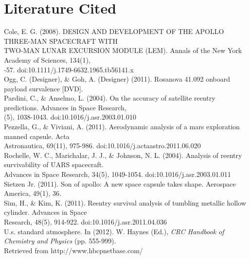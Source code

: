 \documentclass{article}
\begin{document}
\section{Literature Cited}
	\begin{doublespace}
Cole, E. G. (2008). DESIGN AND DEVELOPMENT OF THE APOLLO THREE-MAN SPACECRAFT WITH\\
\indent TWO-MAN LUNAR EXCURSION MODULE (LEM). Annals of the New York Academy of Sciences, 134(1),\\
-57. doi:10.1111/j.1749-6632.1965.tb56141.x\\
Ogg, C. (Designer), \& Goh, A. (Designer) (2011). Rosanova 41.092 onboard payload survalence [DVD].\\
Pardini, C., \& Anselmo, L. (2004). On the accuracy of satellite reentry predictions. Advances in Space Research,\\ (5), 1038-1043. doi:10.1016/j.asr.2003.01.010\\
Pezzella, G., \& Viviani, A. (2011). Aerodynamic analysis of a mars exploration manned capsule. Acta\\
\indent Astronautica, 69(11), 975-986. doi:10.1016/j.actaastro.2011.06.020\\
Rochelle, W. C., Marichalar, J. J., \& Johnson, N. L. (2004). Analysis of reentry survivability of UARS spacecraft.\\ \indent Advances in Space Research, 34(5), 1049-1054. doi:10.1016/j.asr.2003.01.011\\
Sietzen Jr. (2011). Son of apollo: A new space capsule takes shape. Aerospace America, 49(1), 36.\\
Sim, H., \& Kim, K. (2011). Reentry survival analysis of tumbling metallic hollow cylinder. Advances in Space\\ 
\indent Research, 48(5), 914-922. doi:10.1016/j.asr.2011.04.036\\
U.s. standard atmosphere. In (2012). W. Haynes (Ed.), \emph{CRC Handbook of Chemistry and Physics} (pp. 555-999).\\ \indent Retrieved from http://www.hbcpnetbase.com/

	\end{doublespace}
	
\newpage
\end{document}
